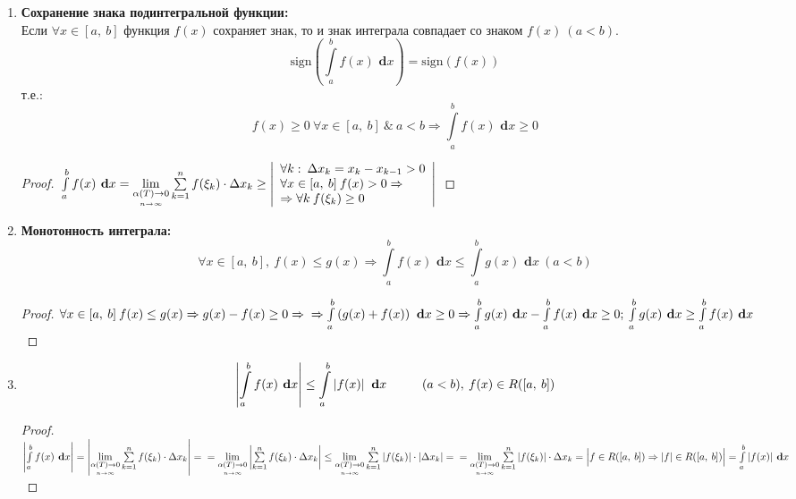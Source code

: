 \documentclass[a4paper,12pt, centered]{bookest}
\theoremstyle{remark}
\newcommand\tab[1][1cm]{\hspace*{#1}}
\newcommand\dx{\textbf{ d}x}
\begin{document}
\begin{enumerate}
\begin{proof}
\begin{itemize}
				\item [b)] пусть, например, $a<b<c\\$Тогда:\\$\int\limits_{a}^{c}f(x)\dx=\int\limits_{a}^{b}f(x)\dx+\int\limits_{b}^{c}f(x)\dx;\\\int\limits_{a}^{b}f(x)\dx=\int\limits_{a}^{c}f(x)\dx-\int\limits_{b}^{c}f(x)\dx=\int\limits_{a}^{c}f(x)\dx+\int\limits_{c}^{b}f(x)\dx$
			\end{itemize}
		\end{proof} 
	\item \textbf{Сохранение знака подинтегральной функции:}\\Если $\forall x\in[a,\>b]$ функция $f(x)$ сохраняет знак, то и знак интеграла совпадает со знаком $f(x)\>(a<b).$ $$\textrm{sign}\left(\int\limits_{a}^{b}f(x)\dx\right)=\textrm{sign}\left(f(x)\right)$$ т.е.: $$f(x)\geq0\>\forall x\in[a,\>b]\>\&\> a<b\Rightarrow\int\limits_{a}^{b}f(x)\dx\geq0$$\begin{proof}
			$\\\int\limits_{a}^{b}f(x)\dx=\lim\limits_{\underset{n\to\infty}{\alpha(T)\to0}}\sum\limits_{k=1}^{n} f(\xi_k)\cdot\Delta x_k\geq \left|\begin{array}{l}
				\forall k:\>\Delta x_k=x_k-x_{k-1}>0\\ \forall x\in[a,\>b]\>f(x)>0\Rightarrow\\\Rightarrow\forall k\>f(\xi_k)\geq0
			\end{array} \right|\\$
		\end{proof}
	\item \textbf{Монотонность интеграла:}
		$$\forall x\in[a,\>b],\>f(x)\leq g(x)\Rightarrow\int\limits_{a}^{b}f(x)\dx\leq\int\limits_{a}^{b}g(x)\dx\>(a<b)$$
		\begin{proof}
				$\forall x\in[a,\>b]\>f(x)\leq g(x)\Rightarrow g(x)-f(x)\geq0\Rightarrow\\\Rightarrow\int\limits_{a}^{b}\left(g(x)+f(x)\right)\dx\geq0\Rightarrow\int\limits_{a}^{b}g(x)\dx-\int\limits_{a}^{b}f(x)\dx\geq0;\>\int\limits_{a}^{b}g(x)\dx\geq\int\limits_{a}^{b}f(x)\dx$
		\end{proof}
	\item $$\left|\int\limits_{a}^{b}f(x)\dx\right|\leq\int\limits_{a}^{b}\left|f(x)\right|\dx\tab (a<b),\>f(x)\in R([a,\>b])$$\begin{proof}
		$\left|\int\limits_{a}^{b}f(x)\dx\right|=\left|\lim\limits_{\underset{n\to\infty}{\alpha(T)\to0}}\sum\limits_{k=1}^{n} f(\xi_k)\cdot\Delta x_k\right|=\\=\lim\limits_{\underset{n\to\infty}{\alpha(T)\to0}}\left|\sum\limits_{k=1}^{n} f(\xi_k)\cdot\Delta x_k\right|\leq\lim\limits_{\underset{n\to\infty}{\alpha(T)\to0}}\sum\limits_{k=1}^{n} \left|f(\xi_k)\right|\cdot|\Delta x_k|=\\=\lim\limits_{\underset{n\to\infty}{\alpha(T)\to0}}\sum\limits_{k=1}^{n}\left|f(\xi_k)\right|\cdot\Delta x_k=\Big|f\in R([a,\>b])\Rightarrow |f|\in R([a,\>b])\Big|=\int\limits_{a}^{b}|f(x)|\dx$

\end{proof}
\end{enumerate}
\end{document}

